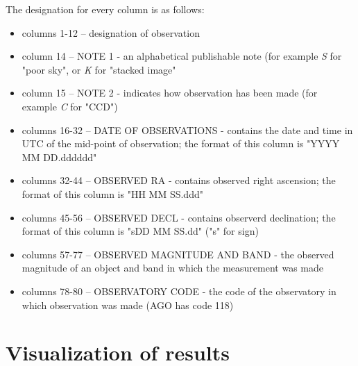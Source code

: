 	The designation for every column is as follows:
	
	\begin{itemize}
		\item columns 1-12 -- designation of observation
		\item column 14 -- NOTE 1 - an alphabetical publishable note (for example \emph{S} for "poor sky", or \emph{K} for "stacked image"
		\item column 15 -- NOTE 2 - indicates how observation has been made (for example \emph{C} for "CCD")
		\item columns 16-32 -- DATE OF OBSERVATIONS - contains the date and time in UTC of the mid-point of observation; the format of this column is "YYYY MM DD.dddddd"
		\item columns 32-44 -- OBSERVED RA - contains observed right ascension; the format of this column is "HH MM SS.ddd"
		\item columns 45-56 -- OBSERVED DECL - contains observerd declination; the format of this column is "sDD MM SS.dd" ("s" for sign)
		\item columns 57-77 -- OBSERVED MAGNITUDE AND BAND - the observed magnitude of an object and band in which the measurement was made
		\item columns 78-80 -- OBSERVATORY CODE - the code of the observatory in which observation was made (AGO has code 118)
	\end{itemize}

	\citep{mpc}

\section{Visualization of results}\label{sec:visualization}
